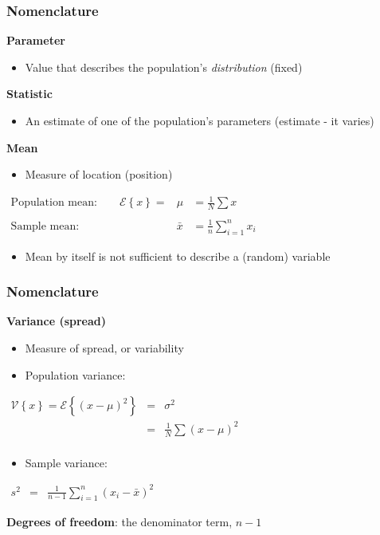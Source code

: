 \begin{frame}\frametitle{Nomenclature}
	\textbf{Parameter}
	\begin{itemize}
		\item Value that describes the population's \emph{distribution} (fixed)
	\end{itemize}

	\textbf{Statistic}
	\begin{itemize}
		\item An estimate of one of the population's parameters (estimate - it varies)
	\end{itemize}

	\textbf{Mean}
	\begin{itemize}
		\item Measure of location (position)
	\end{itemize}

	$
	\begin{array}{rcl}
		\text{Population mean:} \qquad \mathcal{E}\left\{x \right\} = &\mu &= \displaystyle \frac{1}{N}\sum{x} \\
		\\
		\text{Sample mean:} \qquad &\bar{x} &= \displaystyle \frac{1}{n}\sum_{i=1}^{n}{x_i}
	\end{array}
	$
	\begin{itemize}
		\item Mean by itself is not sufficient to describe a (random) variable
	\end{itemize}
\end{frame}

\begin{frame}\frametitle{Nomenclature}
	\textbf{Variance (spread)}
	\begin{itemize}
		\item Measure of spread, or variability
		\item Population variance:
	\end{itemize}

	$
	\begin{array}{rcl}
		\mathcal{V}\left\{x\right\} = \mathcal{E}\left\{ (x - \mu )^2\right\} &=& \sigma^2 \\
		&=& \displaystyle \frac{1}{N}\sum{(x-\mu)^2} \\
	\end{array}
	$
	\begin{itemize}
		\item Sample variance:
	\end{itemize}
	$
	\begin{array}{rcl}
		s^2 &=& \displaystyle \frac{1}{n-1}\sum_{i=1}^{n}{(x_i - \bar{x})^2}
	\end{array}
	$

	\textbf{Degrees of freedom}: the denominator term, $n-1$
\end{frame}

